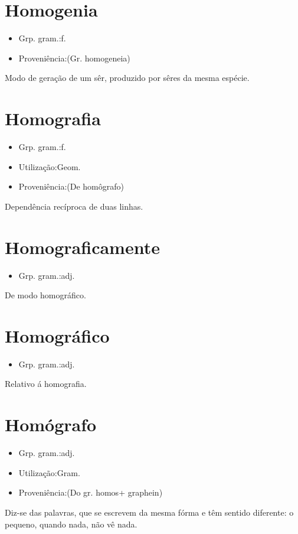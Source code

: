 \documentclass{article}
\begin{document}
\section{Homogenia}
\begin{itemize}
\item {Grp. gram.:f.}
\end{itemize}
\begin{itemize}
\item {Proveniência:(Gr. \textunderscore homogeneia\textunderscore )}
\end{itemize}
Modo de geração de um sêr, produzido por sêres da mesma espécie.
\section{Homografia}
\begin{itemize}
\item {Grp. gram.:f.}
\end{itemize}
\begin{itemize}
\item {Utilização:Geom.}
\end{itemize}
\begin{itemize}
\item {Proveniência:(De \textunderscore homôgrafo\textunderscore )}
\end{itemize}
Dependência recíproca de duas linhas.
\section{Homograficamente}
\begin{itemize}
\item {Grp. gram.:adj.}
\end{itemize}
De modo homográfico.
\section{Homográfico}
\begin{itemize}
\item {Grp. gram.:adj.}
\end{itemize}
Relativo á homografia.
\section{Homógrafo}
\begin{itemize}
\item {Grp. gram.:adj.}
\end{itemize}
\begin{itemize}
\item {Utilização:Gram.}
\end{itemize}
\begin{itemize}
\item {Proveniência:(Do gr. \textunderscore homos\textunderscore  + \textunderscore graphein\textunderscore )}
\end{itemize}
Diz-se das palavras, que se escrevem da mesma fórma e têm sentido diferente: \textunderscore o pequeno, quando nada, não vê nada\textunderscore .
\end{document}
